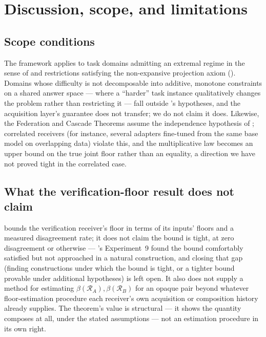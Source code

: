 \documentclass[11pt,twocolumn,a4paper]{article}
\theoremstyle{rdm}
\theoremstyle{definition}
\theoremstyle{remark}
\newcommand{\flo}{\beta}
\newcommand{\Rec}{\mathcal{R}}
\begin{document}
\section{Discussion, scope, and limitations}
\label{sec:discussion}

\subsection{Scope conditions}

The framework applies to task domains admitting an extremal regime in the
sense of  and restrictions satisfying the non-expansive
projection axiom (). Domains whose difficulty is not
decomposable into additive, monotone constraints on a shared answer space
--- where a ``harder'' task instance qualitatively changes the problem
rather than restricting it --- fall outside 's
hypotheses, and the acquisition layer's guarantee does not transfer; we do
not claim it does. Likewise, the Federation and Cascade Theorems assume the
independence hypothesis of ; correlated receivers (for
instance, several adapters fine-tuned from the same base model on
overlapping data) violate this, and the multiplicative law becomes an
upper bound on the true joint floor rather than an equality, a direction we
have not proved tight in the correlated case.

\subsection{What the verification-floor result does not claim}

 bounds the verification receiver's floor in terms of
its inputs' floors and a measured disagreement rate; it does not claim the
bound is tight, at zero disagreement or otherwise --- 's
Experiment~9 found the bound comfortably satisfied but not approached in a
natural construction, and closing that gap (finding constructions under
which the bound is tight, or a tighter bound provable under additional
hypotheses) is left open. It also does not supply a method for estimating
$\flo(\Rec_A),\flo(\Rec_B)$ for an
opaque pair beyond whatever floor-estimation procedure each receiver's own
acquisition or composition history already supplies. The theorem's value is
structural --- it shows the quantity composes at all, under the stated
assumptions --- not an estimation procedure in its own right.
\end{document}

